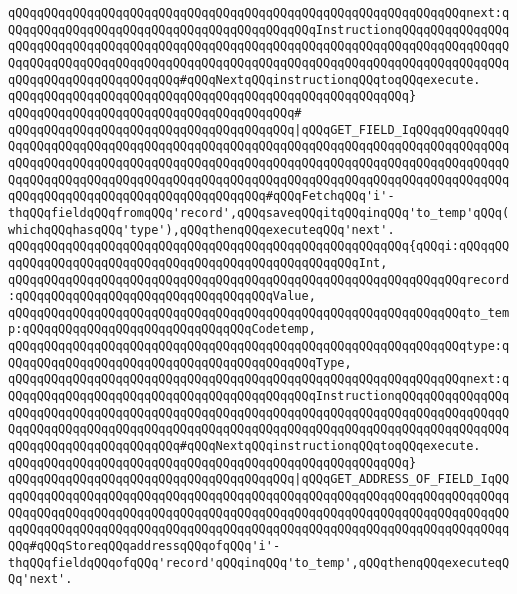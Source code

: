 \verb|qQQqqQQqqQQqqQQqqQQqqQQqqQQqqQQqqQQqqQQqqQQqqQQqqQQqqQQqqQQqqQQqnext:qQQqqQQqqQQqqQQqqQQqqQQqqQQqqQQqqQQqqQQqqQQqInstructionqQQqqQQqqQQqqQQqqQQqqQQqqQQqqQQqqQQqqQQqqQQqqQQqqQQqqQQqqQQqqQQqqQQqqQQqqQQqqQQqqQQqqQQqqQQqqQQqqQQqqQQqqQQqqQQqqQQqqQQqqQQqqQQqqQQqqQQqqQQqqQQqqQQqqQQqqQQqqQQqqQQqqQQqqQQqqQQqqQQq#qQQqNextqQQqinstructionqQQqtoqQQqexecute.|\newline
\verb|qQQqqQQqqQQqqQQqqQQqqQQqqQQqqQQqqQQqqQQqqQQqqQQqqQQqqQQq}|\newline
\verb|qQQqqQQqqQQqqQQqqQQqqQQqqQQqqQQqqQQqqQQq#|\newline
\verb|qQQqqQQqqQQqqQQqqQQqqQQqqQQqqQQqqQQqqQQq|\verb#|qQQqGET_FIELD_IqQQqqQQqqQQqqQQqqQQqqQQqqQQqqQQqqQQqqQQqqQQqqQQqqQQqqQQqqQQqqQQqqQQqqQQqqQQqqQQqqQQqqQQqqQQqqQQqqQQqqQQqqQQqqQQqqQQqqQQqqQQqqQQqqQQqqQQqqQQqqQQqqQQqqQQqqQQqqQQqqQQqqQQqqQQqqQQqqQQqqQQqqQQqqQQqqQQqqQQqqQQqqQQqqQQqqQQqqQQqqQQqqQQqqQQqqQQqqQQqqQQqqQQqqQQqqQQqqQQq#\verb|#qQQqFetchqQQq'i'-thqQQqfieldqQQqfromqQQq'record',qQQqsaveqQQqitqQQqinqQQq'to_temp'qQQq(whichqQQqhasqQQq'type'),qQQqthenqQQqexecuteqQQq'next'.|\newline
\verb|qQQqqQQqqQQqqQQqqQQqqQQqqQQqqQQqqQQqqQQqqQQqqQQqqQQqqQQq{qQQqi:qQQqqQQqqQQqqQQqqQQqqQQqqQQqqQQqqQQqqQQqqQQqqQQqqQQqqQQqInt,|\newline
\verb|qQQqqQQqqQQqqQQqqQQqqQQqqQQqqQQqqQQqqQQqqQQqqQQqqQQqqQQqqQQqqQQqrecord:qQQqqQQqqQQqqQQqqQQqqQQqqQQqqQQqqQQqValue,|\newline
\verb|qQQqqQQqqQQqqQQqqQQqqQQqqQQqqQQqqQQqqQQqqQQqqQQqqQQqqQQqqQQqqQQqto_temp:qQQqqQQqqQQqqQQqqQQqqQQqqQQqqQQqCodetemp,|\newline
\verb|qQQqqQQqqQQqqQQqqQQqqQQqqQQqqQQqqQQqqQQqqQQqqQQqqQQqqQQqqQQqqQQqtype:qQQqqQQqqQQqqQQqqQQqqQQqqQQqqQQqqQQqqQQqqQQqType,|\newline
\verb|qQQqqQQqqQQqqQQqqQQqqQQqqQQqqQQqqQQqqQQqqQQqqQQqqQQqqQQqqQQqqQQqnext:qQQqqQQqqQQqqQQqqQQqqQQqqQQqqQQqqQQqqQQqqQQqInstructionqQQqqQQqqQQqqQQqqQQqqQQqqQQqqQQqqQQqqQQqqQQqqQQqqQQqqQQqqQQqqQQqqQQqqQQqqQQqqQQqqQQqqQQqqQQqqQQqqQQqqQQqqQQqqQQqqQQqqQQqqQQqqQQqqQQqqQQqqQQqqQQqqQQqqQQqqQQqqQQqqQQqqQQqqQQqqQQqqQQq#qQQqNextqQQqinstructionqQQqtoqQQqexecute.|\newline
\verb|qQQqqQQqqQQqqQQqqQQqqQQqqQQqqQQqqQQqqQQqqQQqqQQqqQQqqQQq}|\newline
\newline
\verb|qQQqqQQqqQQqqQQqqQQqqQQqqQQqqQQqqQQqqQQq|\verb#|qQQqGET_ADDRESS_OF_FIELD_IqQQqqQQqqQQqqQQqqQQqqQQqqQQqqQQqqQQqqQQqqQQqqQQqqQQqqQQqqQQqqQQqqQQqqQQqqQQqqQQqqQQqqQQqqQQqqQQqqQQqqQQqqQQqqQQqqQQqqQQqqQQqqQQqqQQqqQQqqQQqqQQqqQQqqQQqqQQqqQQqqQQqqQQqqQQqqQQqqQQqqQQqqQQqqQQqqQQqqQQqqQQqqQQqqQQqqQQq#\verb|#qQQqStoreqQQqaddressqQQqofqQQq'i'-thqQQqfieldqQQqofqQQq'record'qQQqinqQQq'to_temp',qQQqthenqQQqexecuteqQQq'next'.|\newline
